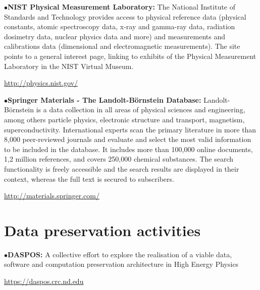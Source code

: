 \medskip
\medskip


\medskip

\item{$\bullet$}{\bf NIST Physical Measurement Laboratory:} 
The National Institute of Standards and Technology provides access to physical reference data (physical constants, atomic spectroscopy data, x-ray and gamma-ray data, radiation dosimetry data, nuclear physics data and more) and measurements and calibrations data (dimensional and electromagnetic measurements). The site points to a general interest page, linking to exhibits of the Physical Measurement Laboratory in the NIST Virtual Museum.
	\item{}\qquad\url{http://physics.nist.gov/}

\medskip

\item{$\bullet$}{\bf Springer Materials  - The Landolt-B\"ornstein Database:}
Landolt-B\"ornstein is a data collection in all areas of physical sciences and engineering, among others particle physics, electronic structure and transport, magnetism, superconductivity. International experts scan the primary literature in more than 8,000 peer-reviewed journals and evaluate and select the most valid information to be included in the database. It includes more than 100,000 online documents, 1,2 million references, and covers 250,000 chemical substances.
The search functionality is freely accessible and the search results are displayed in their context, whereas the full text is secured to subscribers.
	\item{}\qquad\url{http://materials.springer.com/}

\medskip


\section{Data preservation activities}  %

\medskip


\medskip

\item{$\bullet$}{\bf DASPOS:} 
A collective effort to explore the realisation of a viable data, software and computation preservation architecture in High Energy Physics
	\item{}\qquad\url{https://daspos.crc.nd.edu}


